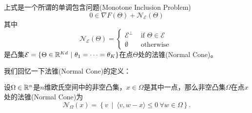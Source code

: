 上式是一个所谓的单调包含问题(Monotone Inclusion Problem)
\begin{equation}
\label{eq:fedsplit-mono-incl}
0 \in \nabla F(\Theta) + \mathcal{N}_{\mathcal{E}}(\Theta)
\end{equation}
其中
\begin{equation*}
\mathcal{N}_{\mathcal{E}}(\Theta) = \begin{cases} \mathcal{E}^{\perp} & \text{ if } \Theta \in \mathcal{E} \\ \emptyset & \text{ otherwise } \end{cases}
\end{equation*}
是凸集$\mathcal{E} = \{ \Theta \in \mathbb{R}^{Kd} ~ | ~ \theta_1 = \cdots = \theta_K\}$在点$\Theta$处的法锥(Normal Cone)。

我们回忆一下法锥(Normal Cone)的定义：
\begin{definition}
设$\Omega \in \mathbb{R}^n$是$n$维欧氏空间中的非空凸集，$x \in \Omega$是其中一点，那么非空凸集$\Omega$在点$x$处的法锥(Normal Cone)为
\begin{equation}
\label{eq:def-normal-cone}
\mathcal{N}_{\Omega}(x) = \left\{ v ~ \middle| ~ \langle v, w - x \rangle \leqslant 0 ~ \forall w \in \Omega \right\}.
\end{equation}
\end{definition}



